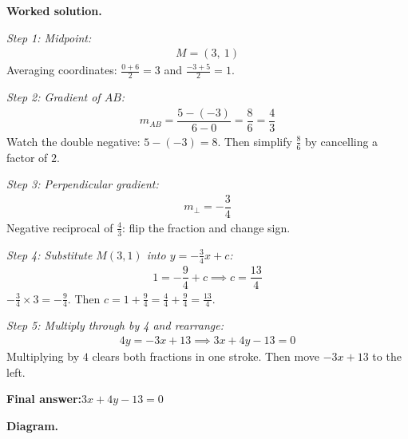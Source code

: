\documentclass[11pt]{article}
\begin{document}
\textbf{Worked solution.}

\textit{Step 1: Midpoint:}
\[\begin{gathered}
M = \left(3,\ 1\right)
\end{gathered}\]
Averaging coordinates: \( \tfrac{0+6}{2} = 3 \) and \( \tfrac{-3+5}{2} = 1 \).

\textit{Step 2: Gradient of \( AB \):}
\[\begin{gathered}
m_{AB} = \dfrac{5-(-3)}{6-0} = \dfrac{8}{6} = \dfrac{4}{3}
\end{gathered}\]
Watch the double negative: \( 5 - (-3) = 8 \). Then simplify \( \tfrac{8}{6} \) by cancelling a factor of \( 2 \).

\textit{Step 3: Perpendicular gradient:}
\[\begin{gathered}
m_\perp = -\dfrac{3}{4}
\end{gathered}\]
Negative reciprocal of \( \tfrac{4}{3} \): flip the fraction and change sign.

\textit{Step 4: Substitute \( M(3,1) \) into \( y = -\frac{3}{4}x + c \):}
\[\begin{gathered}
1 = -\dfrac{9}{4} + c \implies c = \dfrac{13}{4}
\end{gathered}\]
\( -\tfrac{3}{4} \times 3 = -\tfrac{9}{4} \). Then \( c = 1 + \tfrac{9}{4} = \tfrac{4}{4} + \tfrac{9}{4} = \tfrac{13}{4} \).

\textit{Step 5: Multiply through by 4 and rearrange:}
\[\begin{gathered}
4y = -3x + 13 \implies 3x + 4y - 13 = 0
\end{gathered}\]
Multiplying by \( 4 \) clears both fractions in one stroke. Then move \( -3x + 13 \) to the left.

\begin{answerbox}
\textbf{Final answer:}\quad \(\displaystyle 3x + 4y - 13 = 0\)
\end{answerbox}
\textbf{Diagram.}
\end{document}
